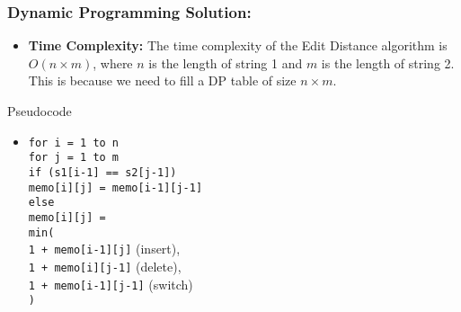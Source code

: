\documentclass[10pt,aspectratio=43]{beamer}
\begin{document}
\begin{frame}
    \frametitle{Dynamic Programming Solution:}
    \begin{itemize}
        \item \textbf{Time Complexity:} The time complexity of the Edit Distance algorithm is \(O(n \times m)\), where \(n\) is the length of string 1 and \(m\) is the length of string 2. This is because we need to fill a DP table of size \(n \times m\).
    \end{itemize}

    \begin{block}{Pseudocode}
    \begin{itemize}
        \item \texttt{for i = 1 to n} \\
        \quad \texttt{for j = 1 to m} \\
        \quad\quad \texttt{if (s1[i-1] == s2[j-1])} \\
        \quad\quad\quad \texttt{memo[i][j] = memo[i-1][j-1]} \\
        \quad\quad \texttt{else} \\
        \quad\quad\quad \texttt{memo[i][j] =} \\
        \quad\quad\quad\quad \texttt{min(} \\
        \quad\quad\quad\quad\quad \texttt{1 + memo[i-1][j]} \quad (insert), \\
        \quad\quad\quad\quad\quad \texttt{1 + memo[i][j-1]} \quad (delete), \\
        \quad\quad\quad\quad\quad \texttt{1 + memo[i-1][j-1]} \quad (switch) \\
        \quad\quad\quad\quad \texttt{)}
    \end{itemize}
    \end{block}

\end{frame}
\end{document}
